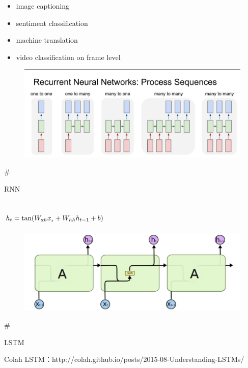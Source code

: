 \documentclass[11pt]{article}
\makeatletter
\def\maxwidth{\ifdim\Gin@nat@width>\linewidth\linewidth
    \else\Gin@nat@width\fi}
\let\Oldincludegraphics\includegraphics
\renewcommand{\includegraphics}[1]{\Oldincludegraphics[width=.8\maxwidth]{#1}}
\providecommand{\tightlist}{%
      \setlength{\itemsep}{0pt}\setlength{\parskip}{0pt}}
\makeatother
\begin{document}
\begin{itemize}
\tightlist
\item
  image captioning
\item
  sentiment classification
\item
  machine translation
\item
  video classification on frame level
\end{itemize}

\begin{figure}
\centering
\includegraphics{rnn-model.png}
\caption{}
\end{figure}

    \#

RNN

\subsection{\texorpdfstring{\({h_t} = \tan ({W_{{\rm{x}}h}}{x_{_t}} + {W_{hh}}{h_{t - 1}} + b)\)}{\{h\_t\} = \textbackslash{}tan (\{W\_\{\{\textbackslash{}rm\{x\}\}h\}\}\{x\_\{\_t\}\} + \{W\_\{hh\}\}\{h\_\{t - 1\}\} + b)}}\label{h_t-tan-w_rmxhx__t-w_hhh_t---1-b}

\begin{figure}
\centering
\includegraphics{rnn.png}
\caption{}
\end{figure}

    \#

LSTM

Colah LSTM：http://colah.github.io/posts/2015-08-Understanding-LSTMs/
\end{document}

